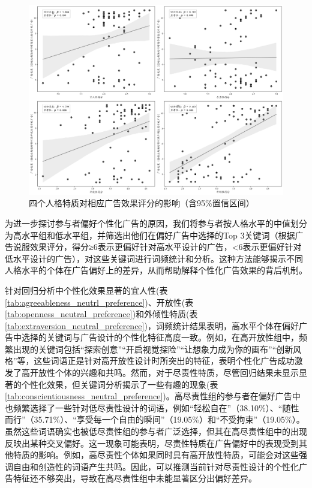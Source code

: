 \begin{figure}[H]
    \centering
    \includegraphics[width=1.0\linewidth]{Image/Study1-exp3-result.png}
    \caption{\label{fig:Study1-exp3-result}四个人格特质对相应广告效果评分的影响（含95\%置信区间）}
\end{figure}

为进一步探讨参与者偏好个性化广告的原因，我们将参与者按人格水平的中值划分为高水平组和低水平组，并筛选出他们在偏好广告中选择的Top 3关键词（根据广告说服效果评分，得分≥6表示更偏好针对高水平设计的广告，<6表示更偏好针对低水平设计的广告），对这些关键词进行词频统计和分析。这种方法能够揭示不同人格水平的个体在广告偏好上的差异，从而帮助解释个性化广告效果的背后机制。

针对回归分析中个性化效果显著的宜人性(表\ref{tab:agreeableness_neutrl_preference})、开放性(表\ref{tab:openness_neutral_preference})和外倾性特质(表\ref{tab:extraversion_neutral_preference})，词频统计结果表明，高水平个体在偏好广告中选择的关键词与广告设计的个性化特征高度一致。例如，在高开放性组中，频繁出现的关键词包括“探索创意”“开启视觉探险”“让想象力成为你的画布”“创新风格”等，这些词语正是针对高开放性设计时所突出的特征，表明个性化广告成功激发了高开放性个体的兴趣和共鸣。然而，对于尽责性特质，尽管回归结果未显示显著的个性化效果，但关键词分析揭示了一些有趣的现象(表\ref{tab:conscientiousness_neutral_preference})。高尽责性组的参与者在偏好广告中也频繁选择了一些针对低尽责性设计的词语，例如“轻松自在”（38.10\%）、“随性而行”（35.71\%）、“享受每一个自由的瞬间”（19.05\%）和“不受拘束”（19.05\%）。虽然这些词语确实也被低尽责性组的参与者广泛选择，但其在高尽责性组中的出现反映出某种交叉偏好。这一现象可能表明，尽责性特质在广告偏好中的表现受到其他特质的影响。例如，高尽责性个体如果同时具有高开放性特质，可能会对这些强调自由和创造性的词语产生共鸣。因此，可以推测当前针对尽责性设计的个性化广告特征还不够突出，导致在高尽责性组中未能显著区分出偏好差异。


